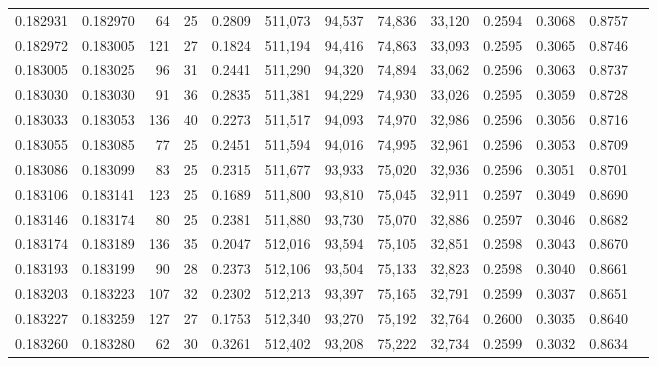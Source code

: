 \begin{tabular}{rrrrrrrrrrrrr}
0.182931 & 0.182970 &    64 &  25 &                                     0.2809 & 511,073 &  94,537 &  74,836 &  33,120 & 0.2594 & 0.3068 & 0.8757 \\
0.182972 & 0.183005 &   121 &  27 &                                     0.1824 & 511,194 &  94,416 &  74,863 &  33,093 & 0.2595 & 0.3065 & 0.8746 \\
0.183005 & 0.183025 &    96 &  31 &                                     0.2441 & 511,290 &  94,320 &  74,894 &  33,062 & 0.2596 & 0.3063 & 0.8737 \\
0.183030 & 0.183030 &    91 &  36 &                                     0.2835 & 511,381 &  94,229 &  74,930 &  33,026 & 0.2595 & 0.3059 & 0.8728 \\
0.183033 & 0.183053 &   136 &  40 &                                     0.2273 & 511,517 &  94,093 &  74,970 &  32,986 & 0.2596 & 0.3056 & 0.8716 \\
0.183055 & 0.183085 &    77 &  25 &                                     0.2451 & 511,594 &  94,016 &  74,995 &  32,961 & 0.2596 & 0.3053 & 0.8709 \\
0.183086 & 0.183099 &    83 &  25 &                                     0.2315 & 511,677 &  93,933 &  75,020 &  32,936 & 0.2596 & 0.3051 & 0.8701 \\
0.183106 & 0.183141 &   123 &  25 &                                     0.1689 & 511,800 &  93,810 &  75,045 &  32,911 & 0.2597 & 0.3049 & 0.8690 \\
0.183146 & 0.183174 &    80 &  25 &                                     0.2381 & 511,880 &  93,730 &  75,070 &  32,886 & 0.2597 & 0.3046 & 0.8682 \\
0.183174 & 0.183189 &   136 &  35 &                                     0.2047 & 512,016 &  93,594 &  75,105 &  32,851 & 0.2598 & 0.3043 & 0.8670 \\
0.183193 & 0.183199 &    90 &  28 &                                     0.2373 & 512,106 &  93,504 &  75,133 &  32,823 & 0.2598 & 0.3040 & 0.8661 \\
0.183203 & 0.183223 &   107 &  32 &                                     0.2302 & 512,213 &  93,397 &  75,165 &  32,791 & 0.2599 & 0.3037 & 0.8651 \\
0.183227 & 0.183259 &   127 &  27 &                                     0.1753 & 512,340 &  93,270 &  75,192 &  32,764 & 0.2600 & 0.3035 & 0.8640 \\
0.183260 & 0.183280 &    62 &  30 &                                     0.3261 & 512,402 &  93,208 &  75,222 &  32,734 & 0.2599 & 0.3032 & 0.8634 \\

\end{tabular}
